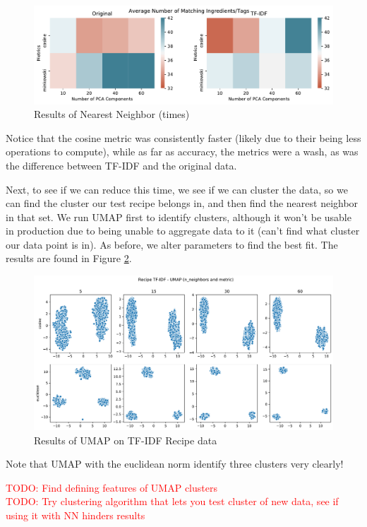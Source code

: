 \documentclass[11pt]{article}
\newcommand\todo[1]{\textcolor{red}{TODO: #1 \\}}
\begin{document}
\begin{figure}[t]
\centering
\includegraphics[width=1\textwidth]{figs/recipeNN_times.pdf}
\caption{Results of Nearest Neighbor (times)}
\label{fig:recipe_nn_times}
\end{figure}

Notice that the cosine metric was consistently faster (likely due to their being less operations to compute), while as far as accuracy, the metrics were a wash, as was the difference between TF-IDF and the original data.

Next, to see if we can reduce this time, we see if we can cluster the data, so we can find the cluster our test recipe belongs in, and then find the nearest neighbor in that set. We run UMAP first to identify clusters, although it won't be usable in production due to being unable to aggregate data to it (can't find what cluster our data point is in). As before, we alter parameters to find the best fit. The results are found in Figure \ref{fig:recipe_umap}.

\begin{figure}[t]
\centering
\includegraphics[width=1\textwidth]{figs/recipeUMAP_tfidf.pdf}
\caption{Results of UMAP on TF-IDF Recipe data}
\label{fig:recipe_umap}
\end{figure}

Note that UMAP with the euclidean norm identify three clusters very clearly!

\todo{Find defining features of UMAP clusters}
\todo{Try clustering algorithm that lets you test cluster of new data, see if using it with NN hinders results}
\end{document}

